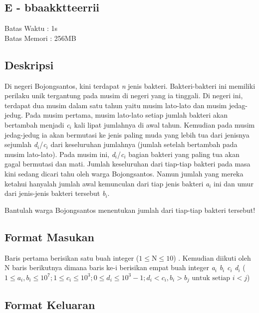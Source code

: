 \documentclass{article}
\begin{document}
\begin{center}
    \section*{E - bbaakktteerrii} %
    Batas Waktu : 1s \\  %
    Batas Memori :  256MB \\ %
\end{center}

\subsection*{Deskripsi}

Di negeri Bojongsantos, kini terdapat \textit{n} jenis bakteri. Bakteri-bakteri ini memiliki perilaku unik tergantung pada musim di negeri yang ia tinggali. Di negeri ini, terdapat dua musim dalam satu tahun yaitu musim lato-lato dan musim jedag-jedug. Pada musim pertama, musim lato-lato setiap jumlah bakteri akan bertambah menjadi \textit{c}$_{i}$ kali lipat jumlahnya di awal tahun. Kemudian pada musim jedag-jedug ia akan bermutasi ke jenis paling muda yang lebih tua dari jenisnya sejumlah \textit{d}$_{i}$/\textit{c}$_{i}$ dari keseluruhan jumlahnya (jumlah setelah bertambah pada musim lato-lato). Pada musim ini, \textit{d}$_{i}$/\textit{c}$_{i}$ bagian bakteri yang paling tua akan gagal bermutasi dan mati. Jumlah keseluruhan dari tiap-tiap bakteri pada masa kini sedang dicari tahu oleh warga Bojongsantos. Namun jumlah yang mereka ketahui hanyalah jumlah awal kemunculan dari tiap jenis bakteri \textit{a}$_{i}$ ini dan umur dari jenis-jenis bakteri tersebut \textit{b}$_{i}$.

Bantulah warga Bojongsantos menentukan jumlah dari tiap-tiap bakteri tersebut!

\subsection*{Format Masukan}
Baris pertama berisikan satu buah integer ($ 1 \leq \text{N} \leq 10 $)
. Kemudian diikuti oleh N baris berikutnya dimana baris ke-i berisikan empat buah integer \textit{a}$_{i}$ \textit{b}$_{i}$ \textit{c}$_{i}$ \textit{d}$_{i}$ ($ 1 \leq a_{i},b_{i} \leq 10^{7}; 1 \leq c_{i} \leq 10^{3}; 0 \leq d_{i} \leq 10^{3}-1; d_{i} < c_{i}, b_{i} > b_{j} \text{ untuk setiap } i < j $)

\subsection*{Format Keluaran}
\end{document}
